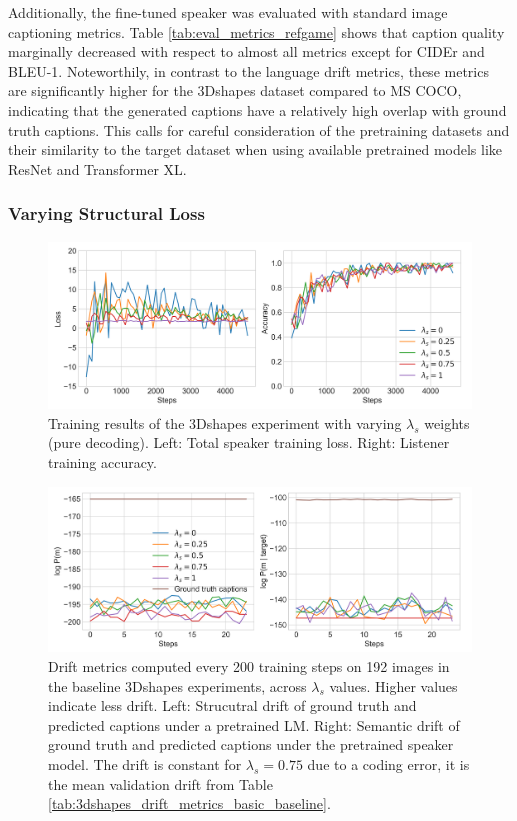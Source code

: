 Additionally, the fine-tuned speaker was evaluated with standard image captioning metrics. Table \ref{tab:eval_metrics_refgame} shows that caption quality marginally decreased with respect to almost all metrics except for CIDEr and BLEU-1. Noteworthily, in contrast to the language drift metrics, these metrics are significantly higher for the 3Dshapes dataset compared to MS COCO, indicating that the generated captions have a relatively high overlap with ground truth captions. This calls for careful consideration of the pretraining datasets and their similarity to the target dataset when using available pretrained models like ResNet and Transformer XL.

\subsubsection{Varying Structural Loss}

\begin{figure}[h]
	\centering
	\includegraphics[width=\linewidth]{images/shapes_refgame_49_pure_losses_all_Ls_random.png}
	\caption{Training results of the 3Dshapes experiment with varying $\lambda_s$ weights (pure decoding). Left: Total speaker training loss. Right: Listener training accuracy.}
	\label{fig:3dshapes_baseline_speaker_loss_listener_acc_all}
\end{figure}

\begin{figure}[h]
	\centering
	\includegraphics[width=\linewidth]{images/shapes_structural_semantic_drift_49_pure_L_s_all_random.png}
	\caption{Drift metrics computed every 200 training steps on 192 images in the baseline 3Dshapes experiments, across $\lambda_s$ values. Higher values indicate less drift. Left: Strucutral drift of ground truth and predicted captions under a pretrained LM. Right: Semantic drift of ground truth and predicted captions under the pretrained speaker model. The drift is constant for $\lambda_s = 0.75$ due to a coding error, it is the mean validation drift from Table \ref{tab:3dshapes_drift_metrics_basic_baseline}.} 
	\label{fig:3dshapes_baseline_all_str_sem_drift}
\end{figure}

